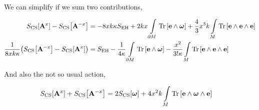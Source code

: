 We can simplify if we sum two contributions,

\begin{align*}
    S_{\textnormal{CS}}\qty[\vb A^x]-S_{\textnormal{CS}}\qty[\vb A^{-x}]&=-8xk\kappa S_{\textnormal{EH}}+2kx\int\limits_{\partial M}\Tr\qty[\vb e\wedge\boldsymbol\omega]+\frac43x^3k\int\limits_M\Tr\qty[\vb e\wedge\vb e\wedge\vb e]\\
    \frac{1}{8xk\kappa}\qty(S_{\textnormal{CS}}\qty[\vb A^{-x}]-S_{\textnormal{CS}}\qty[\vb A^x])&=S_{\textnormal{EH}}-\frac{1}{4\kappa}\int\limits_{\partial M}\Tr\qty[\vb e\wedge\boldsymbol\omega]-\frac{x^2}{3!\kappa}\int\limits_M\Tr\qty[\vb e\wedge\vb e\wedge\vb e]
\end{align*}

And also the not so usual action,

\begin{align*}
    S_{\textnormal{CS}}\qty[\vb A^x]+S_{\textnormal{CS}}\qty[\vb A^{-x}]&=2S_{\textnormal{CS}}\qty[\boldsymbol\omega]+4x^2k\int\limits_M\Tr\qty[\vb e\wedge\boldsymbol\omega\wedge\vb e]
\end{align*}
